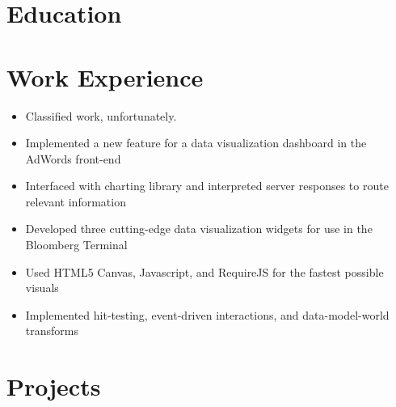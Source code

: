 \documentclass{zres}
\begin{document}
\begin{resume}

\section{Education}



\section{Work Experience}

\begin{itemize}[leftmargin=10pt]
  \item Classified work, unfortunately.
\end{itemize}

\begin{itemize}[leftmargin=10pt]
  \item Implemented a new feature for a data visualization dashboard in the AdWords front-end
  \item Interfaced with charting library and interpreted server responses to route relevant information
\end{itemize}

\begin{itemize}[leftmargin=10pt]
  \item Developed three cutting-edge data visualization widgets for use in the Bloomberg Terminal
  \item Used HTML5 Canvas, Javascript, and RequireJS for the fastest possible visuals
  \item Implemented hit-testing, event-driven interactions, and data-model-world transforms
\end{itemize}

\section{Projects}


\end{resume}
\end{document}
